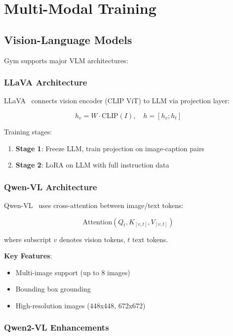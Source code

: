 \section{Multi-Modal Training}


\subsection{Vision-Language Models}

Gym supports major VLM architectures:

\subsubsection{LLaVA Architecture}

LLaVA~\citep{liu2023llava} connects vision encoder (CLIP ViT) to LLM via projection layer:

\begin{equation}
h_v = W \cdot \text{CLIP}(I), \quad h = [h_v; h_t]
\end{equation}

Training stages:
\begin{enumerate}
\item \textbf{Stage 1}: Freeze LLM, train projection on image-caption pairs
\item \textbf{Stage 2}: LoRA on LLM with full instruction data
\end{enumerate}

\subsubsection{Qwen-VL Architecture}

Qwen-VL~\citep{bai2023qwenvl} uses cross-attention between image/text tokens:

\begin{equation}
\text{Attention}(Q_t, K_{[v,t]}, V_{[v,t]})
\end{equation}

where subscript $v$ denotes vision tokens, $t$ text tokens.

\textbf{Key Features}:
\begin{itemize}
\item Multi-image support (up to 8 images)
\item Bounding box grounding
\item High-resolution images (448x448, 672x672)
\end{itemize}

\subsubsection{Qwen2-VL Enhancements}


